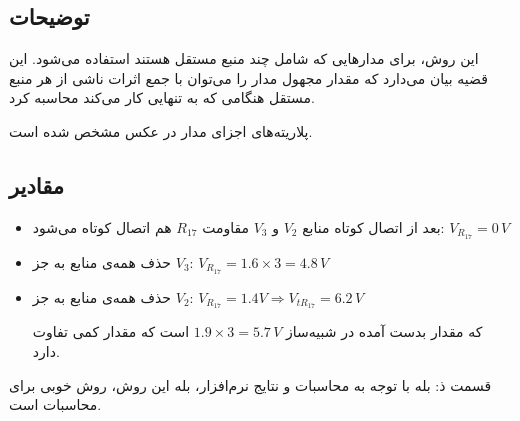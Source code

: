 \documentclass{article}
\begin{document}
		\subsection{توضیحات}
			این روش، برای مدار‌هایی که شامل چند منبع مستقل هستند استفاده می‌شود. این قضیه بیان می‌دارد که مقدار مجهول مدار را می‌توان با جمع اثرات ناشی از هر منبع مستقل هنگامی که به تنهایی کار می‌کند محاسبه کرد.
			
			پلاریته‌های اجزای مدار در عکس مشخص شده است.
		\subsection{مقادیر}
			\begin{itemize}
				\item 
				بعد از اتصال کوتاه منابع $V_2$ و $V_3$ مقاومت $R_{17}$ هم اتصال کوتاه می‌شود:
				$V_{R_{17}} = 0 \, V$
				
				\item 
				حذف همه‌ی منابع به جز $V_3$:
				$V_{R_{17}} = 1.6 \times 3 = 4.8 \, V$
				
				\item 
				حذف همه‌ی منابع به جز $V_2$:
				$V_{R_{17}} = 1.4 V \Rightarrow V_{t R_{17}} = 6.2 \, V$
				
				که مقدار بدست آمده در شبیه‌ساز $1.9 \times 3 = 5.7 \, V$ است که مقدار کمی تفاوت دارد.
			\end{itemize}
		
			قسمت ذ: بله با توجه به محاسبات و نتایج نرم‌افزار، بله این روش، روش خوبی برای محاسبات است.
\end{document}

